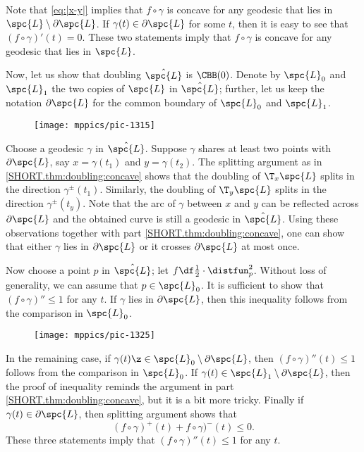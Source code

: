 Note that \ref{eq:|x-y|} implies that $f\circ\gamma$ is concave for any geodesic that lies in $\spc{L}\setminus \partial \spc{L}$.
If $\gamma(t)\in \partial \spc{L}$ for some $t$, then it is easy to see that $(f\circ\gamma)'(t)=0$.
These two statements imply that $f\circ\gamma$ is concave for any geodesic that lies in $\spc{L}$.

Now, let us show that doubling $\hat{\spc{L}}$ is $\CBB(0)$.
Denote by $\spc{L}_0$ and $\spc{L}_1$ the two copies of $\spc{L}$ in $\hat{\spc{L}}$;
further, let us keep the notation $\partial \spc{L}$ for the common boundary of $\spc{L}_0$ and $\spc{L}_1$.

\begin{wrapfigure}{r}{45mm}
\vskip-2mm
\centering
\texttt{[image: mppics/pic-1315]}
\end{wrapfigure}

Choose a geodesic $\gamma$ in $\hat{\spc{L}}$.
Suppose $\gamma$ shares at least two points with $\partial \spc{L}$, say $x=\gamma(t_1)$ and $y=\gamma(t_2)$.
The splitting argument as in \ref{SHORT.thm:doubling:concave} shows that the doubling of $\T_x\spc{L}$ splits in the direction $\gamma^\pm(t_1)$.
Similarly, the doubling of $\T_y\spc{L}$ splits in the direction $\gamma^\pm(t_y)$.
Note that the arc of $\gamma$ between $x$ and $y$ can be reflected across $\partial \spc{L}$ and the obtained curve is still a geodesic in $\hat{\spc{L}}$.
Using these observations together with part \ref{SHORT.thm:doubling:concave}, one can show that either $\gamma$ lies in $\partial \spc{L}$ or it crosses $\partial \spc{L}$ at most once.

Now choose a point $p$ in $\hat{\spc{L}}$;
let $f\df\tfrac12\cdot\distfun_p^2$.
Without loss of generality, we can assume that $p\in \spc{L}_0$.
It is sufficient to show that $(f\circ\gamma)''\le 1$ for any $t$.
If $\gamma$ lies in $\partial \spc{L}$, then this inequality follows from the comparison in $\spc{L}_0$.

\begin{wrapfigure}{r}{45mm}
\vskip-2mm
\centering
\texttt{[image: mppics/pic-1325]}
\end{wrapfigure}

In the remaining case, if $\gamma(t)\z\in \spc{L}_0\setminus\partial\spc{L}$, then $(f\circ\gamma)''(t)\le 1$ follows from the comparison in $\spc{L}_0$.
If $\gamma(t)\in \spc{L}_1\setminus\partial\spc{L}$, then the proof of inequality reminds the argument in part \ref{SHORT.thm:doubling:concave}, but it is a bit more tricky.
Finally if $\gamma(t)\in\partial\spc{L}$, then splitting argument shows that 
\[(f\circ\gamma)^+(t)+f\circ\gamma)^-(t)\le 0.\]
These three statements imply that $(f\circ\gamma)''(t)\le 1$ for any $t$.
\qeds


